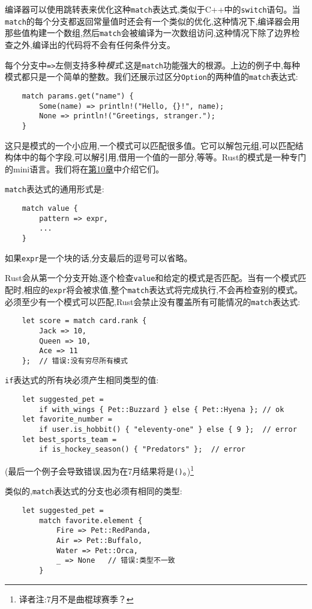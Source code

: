 编译器可以使用跳转表来优化这种\texttt{match}表达式,类似于C++中的\texttt{switch}语句。当\texttt{match}的每个分支都返回常量值时还会有一个类似的优化,这种情况下,编译器会用那些值构建一个数组,然后\texttt{match}会被编译为一次数组访问,这种情况下除了边界检查之外,编译出的代码将不会有任何条件分支。

每个分支中\texttt{=>}左侧支持多种\emph{模式},这是\texttt{match}功能强大的根源。上边的例子中,每种模式都只是一个简单的整数。我们还展示过区分\texttt{Option}的两种值的\texttt{match}表达式:
\begin{verbatim}
    match params.get("name") {
        Some(name) => println!("Hello, {}!", name);
        None => println!("Greetings, stranger.");
    }
\end{verbatim}

这只是模式的一个小应用,一个模式可以匹配很多值。它可以解包元组,可以匹配结构体中的每个字段,可以解引用,借用一个值的一部分,等等。Rust的模式是一种专门的mini语言。我们将在\hyperref[ch10]{第10章}中介绍它们。

\texttt{match}表达式的通用形式是:
\begin{verbatim}
    match value {
        pattern => expr,
        ...
    }
\end{verbatim}
如果\texttt{expr}是一个块的话,分支最后的逗号可以省略。

Rust会从第一个分支开始,逐个检查\texttt{value}和给定的模式是否匹配。当有一个模式匹配时,相应的\texttt{expr}将会被求值,整个\texttt{match}表达式将完成执行,不会再检查别的模式。必须至少有一个模式可以匹配,Rust会禁止没有覆盖所有可能情况的\texttt{match}表达式:
\begin{verbatim}
    let score = match card.rank {
        Jack => 10,
        Queen => 10,
        Ace => 11
    };  // 错误:没有穷尽所有模式
\end{verbatim}

\texttt{if}表达式的所有块必须产生相同类型的值:
\begin{verbatim}
    let suggested_pet = 
        if with_wings { Pet::Buzzard } else { Pet::Hyena }; // ok
    let favorite_number =
        if user.is_hobbit() { "eleventy-one" } else { 9 };  // error
    let best_sports_team = 
        if is_hockey_season() { "Predators" };  // error
\end{verbatim}
(最后一个例子会导致错误,因为在7月结果将是\texttt{()}。)\footnote{译者注:7月不是曲棍球赛季？}

类似的,\texttt{match}表达式的分支也必须有相同的类型:
\begin{verbatim}
    let suggested_pet =
        match favorite.element {
            Fire => Pet::RedPanda,
            Air => Pet::Buffalo,
            Water => Pet::Orca,
            _ => None   // 错误:类型不一致
        }
\end{verbatim}

